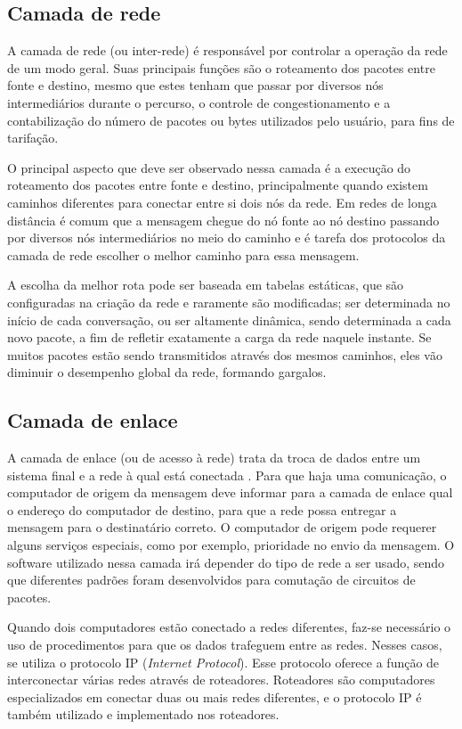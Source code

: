 \subsection{Camada de rede}
A camada de rede (ou inter-rede) é responsável por controlar a operação da rede 
de um modo geral. Suas principais funções são o roteamento dos pacotes entre 
fonte e destino, mesmo que estes tenham que passar por diversos nós 
intermediários durante o percurso, o controle de congestionamento e a 
contabilização do número de pacotes ou bytes utilizados pelo usuário, para fins 
de tarifação.

O principal aspecto que deve ser observado nessa camada é a execução do 
roteamento dos pacotes entre fonte e destino, principalmente quando existem 
caminhos diferentes para conectar entre si dois nós da rede. Em redes de longa 
distância é comum que a mensagem chegue do nó fonte ao nó destino passando por 
diversos nós intermediários no meio do caminho e é tarefa dos protocolos da 
camada de rede escolher o melhor caminho para essa mensagem.

A escolha da melhor rota pode ser baseada em tabelas estáticas, que são 
configuradas na criação da rede e raramente são modificadas; ser 
determinada no início de cada conversação, ou ser altamente dinâmica, sendo 
determinada a cada novo pacote, a fim de refletir exatamente a carga da rede 
naquele instante. Se muitos pacotes estão sendo transmitidos através dos mesmos 
caminhos, eles vão diminuir o desempenho global da rede, formando gargalos.\\

\subsection{Camada de enlace}

A camada de enlace (ou de acesso à rede) trata da troca de dados entre um 
sistema final e a rede à qual está conectada \cite{stallings2005}. Para que 
haja uma comunicação, o computador de origem da mensagem deve informar para a 
camada de enlace qual o endereço do computador de destino, para que a rede 
possa entregar a mensagem para o destinatário correto. O computador de origem 
pode requerer alguns serviços especiais, como por exemplo, prioridade no envio 
da mensagem. O software utilizado nessa camada irá depender do tipo de rede a 
ser usado, sendo que diferentes padrões foram desenvolvidos para comutação de 
circuitos de pacotes.

Quando dois computadores estão conectado a redes diferentes, faz-se necessário 
o uso de procedimentos para que os dados trafeguem entre as redes. Nesses 
casos, se utiliza o protocolo IP (\textit{Internet Protocol}). Esse protocolo 
oferece a função de interconectar várias redes através de roteadores. 
Roteadores são computadores especializados em conectar duas ou mais redes 
diferentes, e o protocolo IP é também utilizado e implementado nos roteadores.


